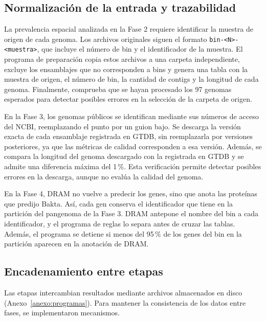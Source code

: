 \subsection{Normalización de la entrada y trazabilidad}

La prevalencia espacial analizada en la Fase 2 requiere identificar la muestra de
origen de cada genoma. Los archivos originales siguen el formato \texttt{bin-<N>-<muestra>},
que incluye el número de bin y el identificador de la muestra. El programa de
preparación copia estos archivos a una carpeta independiente, excluye los
ensamblajes que no corresponden a bins y genera una tabla con la muestra de
origen, el número de bin, la cantidad de contigs y la longitud de cada genoma.
Finalmente, comprueba que se hayan procesado los 97 genomas esperados para
detectar posibles errores en la selección de la carpeta de origen.

En la Fase 3, los genomas públicos se identifican mediante sus números de acceso del NCBI, 
reemplazando el punto por un guion bajo. Se descarga la versión exacta de cada ensamblaje 
registrada en GTDB, sin reemplazarla por versiones posteriores, ya que las métricas de calidad 
corresponden a esa versión. Además, se compara la longitud del genoma descargado con la registrada 
en GTDB y se admite una diferencia máxima del 1\,\%. Esta verificación permite detectar posibles 
errores en la descarga, aunque no evalúa la calidad del genoma.

\begin{nuevo}
En la Fase 4, DRAM no vuelve a predecir los genes, sino que anota las proteínas
que predijo Bakta. Así, cada gen conserva el identificador que tiene en la
partición del pangenoma de la Fase 3. DRAM antepone el nombre del bin a cada
identificador, y el programa de reglas lo separa antes de cruzar las tablas.
Además, el programa se detiene si menos del 95\,\% de los genes del bin en la
partición aparecen en la anotación de DRAM.
\end{nuevo}

\subsection{Encadenamiento entre etapas}
\label{subsec:encadenamiento}

Las etapas intercambian resultados mediante archivos almacenados en disco (Anexo~\ref{anexo:programas}). 
Para mantener la consistencia de los datos entre fases, se implementaron  mecanismos.


